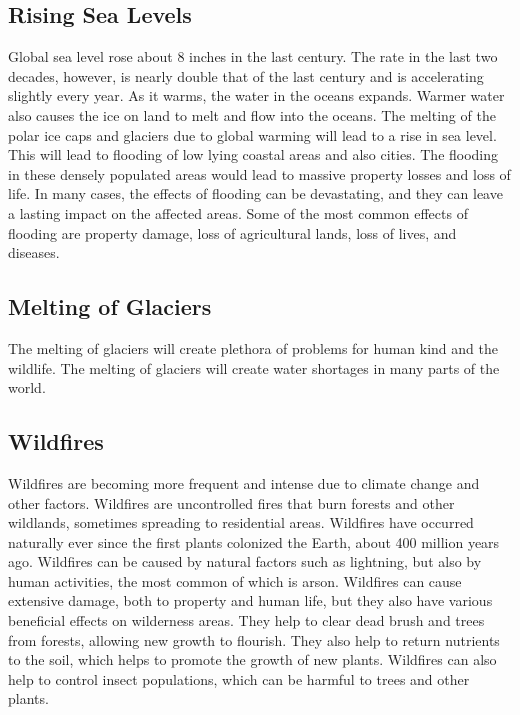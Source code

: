 \documentclass{article}
\begin{document}
\subsection{Rising Sea Levels}
Global sea level rose about 8 inches in the last century. The rate in the last
two decades, however, is nearly double that of the last century and is
accelerating slightly every year. As it warms, the water in the oceans expands.
Warmer water also causes the ice on land to melt and flow into the oceans. The
melting of the polar ice caps and glaciers due to global warming will lead to a
rise in sea level. This will lead to flooding of low lying coastal areas and
also cities. The flooding in these densely populated areas would lead to
massive property losses and loss of life. In many cases, the effects of
flooding can be devastating, and they can leave a lasting impact on the
affected areas. Some of the most common effects of flooding are property
damage, loss of agricultural lands, loss of lives, and diseases.

\subsection{Melting of Glaciers}
The melting of glaciers will create plethora of problems for human kind and the
wildlife. The melting of glaciers will create water shortages in many parts of
the world.

\subsection{Wildfires}
Wildfires are becoming more frequent and intense due to climate change and
other factors. Wildfires are uncontrolled fires that burn forests and other
wildlands, sometimes spreading to residential areas. Wildfires have occurred
naturally ever since the first plants colonized the Earth, about 400 million
years ago. Wildfires can be caused by natural factors such as lightning, but
also by human activities, the most common of which is arson. Wildfires can
cause extensive damage, both to property and human life, but they also have
various beneficial effects on wilderness areas. They help to clear dead brush
and trees from forests, allowing new growth to flourish. They also help to
return nutrients to the soil, which helps to promote the growth of new plants.
Wildfires can also help to control insect populations, which can be harmful to
trees and other plants.
\end{document}
